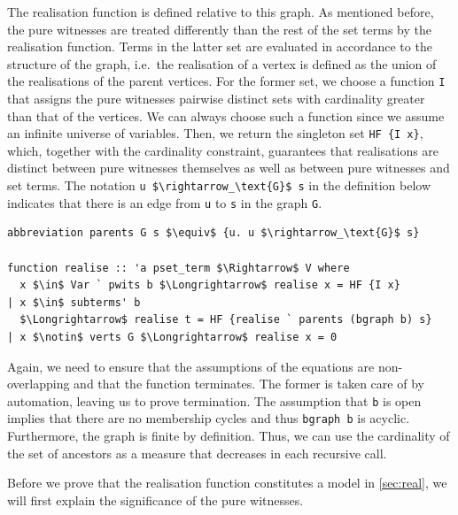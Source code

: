 \documentclass[runningheads]{llncs}
\begin{document}
The realisation function is defined relative to this graph.
As mentioned before, the pure witnesses are treated differently than the rest of the set terms by the realisation function.
Terms in the latter set are evaluated in accordance to the structure of the graph, i.e.\ the realisation of a vertex is defined as the union of the realisations of the parent vertices. 
For the former set, we choose a function \lstinline!I! that assigns the pure witnesses pairwise distinct sets with cardinality greater than that of the vertices.
We can always choose such a function since we assume an infinite universe of variables.
Then, we return the singleton set \lstinline!HF {I x}!, which, together with the cardinality constraint, guarantees that realisations are distinct between pure witnesses themselves as well as between pure witnesses and set terms.  
The notation \lstinline!u $\rightarrow_\text{G}$ s! in the definition below indicates that there is an edge from \lstinline!u! to \lstinline!s! in the graph \lstinline!G!.
\begin{lstlisting}
abbreviation parents G s $\equiv$ {u. u $\rightarrow_\text{G}$ s}

function realise :: 'a pset_term $\Rightarrow$ V where
  x $\in$ Var ` pwits b $\Longrightarrow$ realise x = HF {I x}
| x $\in$ subterms' b
  $\Longrightarrow$ realise t = HF {realise ` parents (bgraph b) s}
| x $\notin$ verts G $\Longrightarrow$ realise x = 0
\end{lstlisting}

Again, we need to ensure that the assumptions of the equations are non-overlapping and that the function terminates.
The former is taken care of by automation, leaving us to prove termination.
The assumption that \lstinline!b! is open implies that there are no membership cycles and thus \lstinline!bgraph b! is acyclic.
Furthermore, the graph is finite by definition.
Thus, we can use the cardinality of the set of ancestors as a measure that decreases in each recursive call.

Before we prove that the realisation function constitutes a model in \autoref{sec:real}, we will first explain the significance of the pure witnesses.
\end{document}
